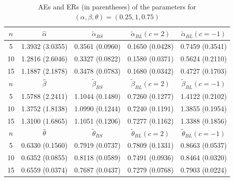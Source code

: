 \documentclass[twoside]{article}
\begin{document}
\begin{table}[!ht]
\centering
\caption{{\small AEs and ERs (in parentheses) of the parameters for $(\alpha, \beta, \theta) = (0.25, 1, 0.75)$}}
{ \small
\begin{tabular}[c]{ccccc}
\hline
$ n $ & ${\hat \alpha}$ & $ {{\tilde \alpha}_{BS}} $ & $ {{\tilde \alpha}_{BL}} (c=2)$ & $ {{\tilde \alpha}_{BL}} (c=-1)$  \\
\hline
5 &1.3932 (3.0355)& 0.3561 (0.0960)& 0.1650 (0.0428)& 0.7459 (0.3541) \\
10 &1.2816 (2.6046)& 0.3327 (0.0822)& 0.1580 (0.0371)& 0.5624 (0.2110) \\
15 &1.1887 (2.1878)& 0.3478 (0.0783)& 0.1680 (0.0342)& 0.4727 (0.1703) \\
\hline
$ n $ & ${\hat \beta}$ & $ {{\tilde \beta}_{BS}} $ & $ {{\tilde \beta}_{BL}} (c=2)$ & $ {{\tilde \beta}_{BL}} (c=-1)$  \\
\hline
5 &1.5788 (2.2411)& 1.1044 (0.1480)& 0.7260 (0.1277)& 1.4122 (0.2102) \\
10 &1.3752 (1.8138)& 1.0990 (0.1244)& 0.7240 (0.1191)& 1.3855 (0.1954) \\
15 &1.3100 (1.6865)& 1.1051 (0.1206)& 0.7277 (0.1162)& 1.3388 (0.1856) \\
\hline
$ n $ & ${\hat \theta}$ & $ {{\tilde \theta}_{BS}} $ & $ {{\tilde \theta}_{BL}} (c=2)$ & $ {{\tilde \theta}_{BL}} (c=-1)$  \\
\hline
5 &0.6330 (0.1560)& 0.7919 (0.0737)& 0.7809 (0.1331)& 0.8663 (0.0537) \\
10 &0.6352 (0.0855)& 0.8118 (0.0589)& 0.7491 (0.0936)& 0.8464 (0.0320) \\
15 &0.6559 (0.0374)& 0.7687 (0.0437)& 0.7279 (0.0768)& 0.7903 (0.0224) \\
\hline
\end{tabular}
}
\end{table}
\end{document}
